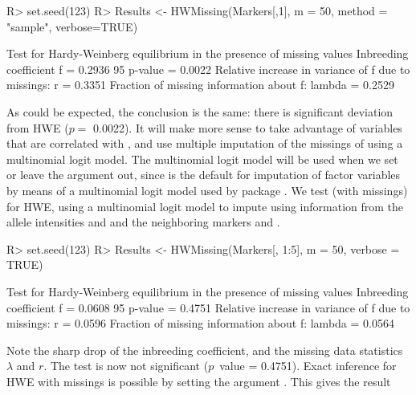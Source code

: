 \documentclass[nojss]{jss}
\begin{document}
\begin{Schunk}
\begin{Sinput}
R> set.seed(123)
R> Results <- HWMissing(Markers[,1], m = 50, method = "sample", verbose=TRUE)
\end{Sinput}
\begin{Soutput}
Test for Hardy-Weinberg equilibrium in the presence of missing values
Inbreeding coefficient f =  0.2936 
95 %
p-value =  0.0022 
Relative increase in variance of f due to missings: r =  0.3351 
Fraction of missing information about f: lambda =  0.2529 
\end{Soutput}
\end{Schunk}

%  
As could be expected, the conclusion is the same: there is significant
deviation from HWE ($p = $ 0.0022). It will make more sense to
take advantage of variables that are correlated with , and
use multiple imputation of the missings of  using a
multinomial logit model. The multinomial logit model will be used when
we set  or leave the  argument
out, since  is the default for imputation of factor
variables by means of a multinomial logit model used by package
. We test  (with missings) for HWE, using a
multinomial logit model to impute  using information from
the allele intensities  and  and the neighboring
markers  and .
%

\begin{Schunk}
\begin{Sinput}
R> set.seed(123)
R> Results <- HWMissing(Markers[, 1:5], m = 50, verbose = TRUE)
\end{Sinput}
\begin{Soutput}
Test for Hardy-Weinberg equilibrium in the presence of missing values
Inbreeding coefficient f =  0.0608 
95 %
p-value =  0.4751 
Relative increase in variance of f due to missings: r =  0.0596 
Fraction of missing information about f: lambda =  0.0564 
\end{Soutput}
\end{Schunk}

%
Note the sharp drop of the inbreeding coefficient, and the missing data statistics $\lambda$ and $r$. The test is now not 
significant ($p$~value = 0.4751). 
Exact inference for HWE with missings is possible
by setting the argument . This gives the result
\end{document}
